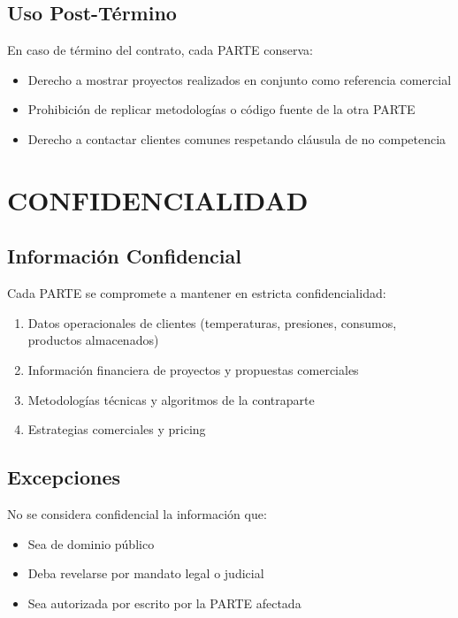 \documentclass[11pt,letterpaper]{article}
\begin{document}
\subsection{Uso Post-Término}

En caso de término del contrato, cada PARTE conserva:
\begin{itemize}
    \item Derecho a mostrar proyectos realizados en conjunto como referencia comercial
    \item Prohibición de replicar metodologías o código fuente de la otra PARTE
    \item Derecho a contactar clientes comunes respetando cláusula de no competencia
\end{itemize}


\section{CONFIDENCIALIDAD}

\subsection{Información Confidencial}

Cada PARTE se compromete a mantener en estricta confidencialidad:

\begin{enumerate}[label=\arabic*.]
    \item Datos operacionales de clientes (temperaturas, presiones, consumos, productos almacenados)
    \item Información financiera de proyectos y propuestas comerciales
    \item Metodologías técnicas y algoritmos de la contraparte
    \item Estrategias comerciales y pricing
\end{enumerate}

\subsection{Excepciones}

No se considera confidencial la información que:
\begin{itemize}
    \item Sea de dominio público
    \item Deba revelarse por mandato legal o judicial
    \item Sea autorizada por escrito por la PARTE afectada
\end{itemize}
\end{document}
